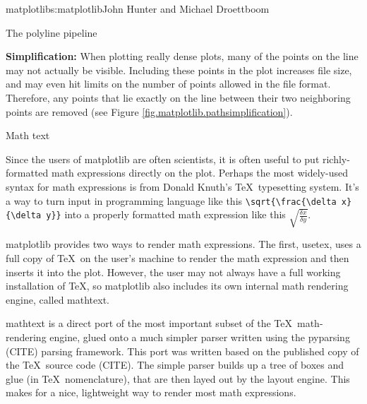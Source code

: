 \begin{aosachapter}{matplotlib}{s:matplotlib}{John Hunter and Michael Droettboom}
\begin{aosasect1}{The polyline pipeline}
\begin{aosaenumerate}
\item \textbf{Simplification:} When plotting really dense plots, many
  of the points on the line may not actually be visible.  Including
  these points in the plot increases file size, and may even hit
  limits on the number of points allowed in the file format.
  Therefore, any points that lie exactly on the line between their two
  neighboring points are removed (see Figure
  \ref{fig.matplotlib.pathsimplification}).

\end{aosaenumerate}




\end{aosasect1}

\begin{aosasect1}{Math text}

Since the users of matplotlib are often scientists, it is often useful
to put richly-formatted math expressions directly on the plot.
Perhaps the most widely-used syntax for math expressions is from
Donald Knuth's \TeX\ typesetting system.  It's a way to turn input in
programming language like this \verb+\sqrt{\frac{\delta x}{\delta y}}+
into a properly formatted math expression like this
$\sqrt{\frac{\delta x}{\delta y}}$.

matplotlib provides two ways to render math expressions.  The first,
usetex, uses a full copy of \TeX\ on the user's machine to render the
math expression and then inserts it into the plot.  However, the user
may not always have a full working installation of \TeX, so
matplotlib also includes its own internal math rendering engine,
called mathtext.

mathtext is a direct port of the most important subset of the
\TeX\ math-rendering engine, glued onto a much simpler parser written
using the pyparsing (CITE) parsing framework.  This port was written
based on the published copy of the \TeX\ source code (CITE).  The
simple parser builds up a tree of boxes and glue (in
\TeX\ nomenclature), that are then layed out by the layout engine.
This makes for a nice, lightweight way to render most math
expressions.

\end{aosasect1}


\end{aosachapter}


